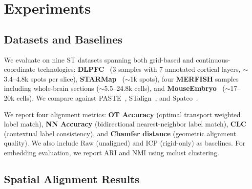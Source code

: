 \documentclass[runningheads]{llncs}
\begin{document}
\section{Experiments}

\subsection{Datasets and Baselines}

We evaluate on nine ST datasets spanning both grid-based and continuous-coordinate technologies: \textbf{DLPFC}~\cite{ref_dlpfc} (3 samples with 7 annotated cortical layers, ${\sim}$3.4--4.8k spots per slice), \textbf{STARMap}~\cite{ref_starmap} (${\sim}$1k spots), four \textbf{MERFISH} samples~\cite{ref_merfish} including whole-brain sections (${\sim}$5.5--24.8k cells), and \textbf{MouseEmbryo}~\cite{ref_embryo} (${\sim}$17--20k cells). We compare against PASTE~\cite{ref_paste}, STalign~\cite{ref_stalign}, and Spateo~\cite{ref_spateo}.

We report four alignment metrics: \textbf{OT Accuracy} (optimal transport weighted label match), \textbf{NN Accuracy} (bidirectional near\-est-neigh\-bor label match), \textbf{CLC} (contextual label consistency), and \textbf{Chamfer distance} (geometric alignment quality). We also include Raw (unaligned) and ICP (rigid-only) as baselines. For embedding evaluation, we report ARI and NMI using mclust clustering.


\subsection{Spatial Alignment Results}
\end{document}
